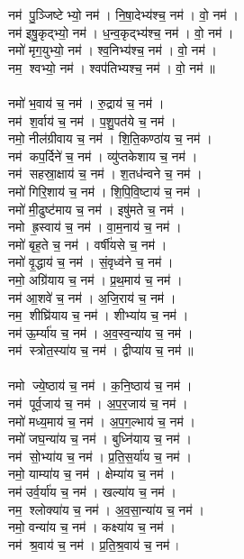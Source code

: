 नम॑ पु॒ञ्जिष्टेभ्यो॒ नम॑। नि॒षा॒देभ्य॑श्च॒ नम॑। वो॒ नम॑। \\
नम॑ इषु॒कृद्भ्यो॒ नम॑। ध॒न्व॒कृद्भ्य॑श्च॒ नम॑। वो॒ नम॑।\\
नमो॑ मृग॒युभ्यो॒ नम॑। श्व॒निभ्य॑श्च॒ नम॑। वो॒ नम॑। \\
नम॒ श्वभ्यो॒ नम॑। श्वप॑तिभ्यश्च॒ नम॑। वो॒ नम॑॥ \\
\\
नमो॑ भ॒वाय॑ च॒ नम॑। रु॒द्राय॑ च॒ नम॑। \\
नम॑ श॒र्वाय॑ च॒ नम॑। प॒शु॒पत॑ये च॒ नम॑।\\
नमो॒ नील॑ग्रीवाय च॒ नम॑। शि॒ति॒कण्ठा॑य च॒ नम॑। \\
नम॑ कप॒र्दिने॑ च॒ नम॑। व्यु॑प्तकेशाय च॒ नम॑।\\
नम॑ सहस्रा॒क्षाय॑ च॒ नम॑। श॒तध॑न्वने च॒ नम॑। \\
नमो॑ गिरि॒शाय॑ च॒ नम॑। शि॒पि॒वि॒ष्टाय॑ च॒ नम॑।\\
नमो॑ मी॒ढुष्ट॑माय च॒ नम॑। इषु॑मते च॒ नम॑। \\
नमो ह्र॒स्वाय॑ च॒ नम॑। वा॒म॒नाय॑ च॒ नम॑।\\
नमो॑ बृह॒ते च॒ नम॑। वर्षी॑यसे च॒ नम॑। \\
नमो॑ वृ॒द्धाय॑ च॒ नम॑। सं॒वृध्व॑ने च॒ नम॑। \\
नमो॒ अग्रि॑याय च॒ नम॑। प्र॒थ॒माय॑ च॒ नम॑। \\
नम॑ आ॒शवे॑ च॒ नम॑। अ॒जि॒राय॑ च॒ नम॑।\\
नम॒ शीघ्रि॑याय च॒ नम॑। शीभ्या॑य च॒ नम॑। \\
नम॑ ऊ॒र्म्या॑य च॒ नम॑। अ॒व॒स्व॒न्या॑य च॒ नम॑। \\
नम॑ स्त्रोत॒स्या॑य च॒ नम॑। द्वीप्या॑य च॒ नम॑॥\\
\\
नमो ज्ये॒ष्ठाय॑ च॒ नम॑। क॒नि॒ष्ठाय॑ च॒ नम॑। \\
नम॑ पूर्व॒जाय॑ च॒ नम॑। अ॒प॒र॒जाय॑ च॒ नम॑। \\
नमो॑ मध्य॒माय॑ च॒ नम॑। अ॒प॒ग॒ल्भाय॑ च॒ नम॑। \\
नमो॑ जघ॒न्या॑य च॒ नम॑। बुध्नि॑याय च॒ नम॑।\\
नम॑ सो॒भ्या॑य च॒ नम॑। प्र॒ति॒स॒र्या॑य च॒ नम॑। \\
नमो॒ याम्या॑य च॒ नम॑। क्षेम्या॑य च॒ नम॑। \\
नम॑ उर्व॒र्या॑य च॒ नम॑। खल्या॑य च॒ नम॑। \\
नम॒ श्लोक्या॑य च॒ नम॑। अ॒व॒सा॒न्या॑य च॒ नम॑। \\
नमो॒ वन्या॑य च॒ नम॑। कक्ष्या॑य च॒ नम॑। \\
नम॑ श्र॒वाय॑ च॒ नम॑। प्र॒ति॒श्र॒वाय॑ च॒ नम॑। \\
